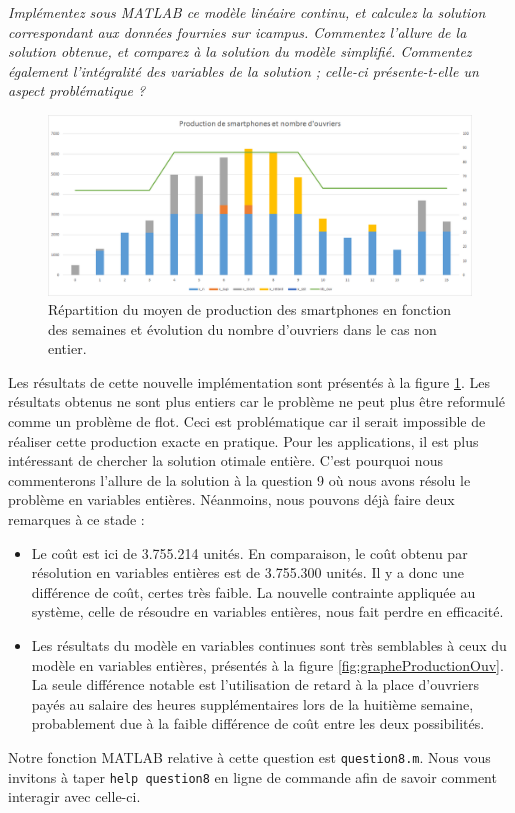 \question %
\emph{Implémentez sous MATLAB ce modèle linéaire continu,
et calculez la solution correspondant aux données fournies sur icampus.
Commentez l'allure de la solution obtenue, et comparez à la solution du modèle
simplifié. Commentez également l'intégralité des variables de la solution ;
celle-ci présente-t-elle un aspect problématique ?}

\begin{figure}[H]
  \begin{center}
    \includegraphics[scale = 0.75]{img/grapheProductionOuvNonInt.png}
	  \caption{Répartition du moyen de production des smartphones en fonction des semaines et évolution du nombre d'ouvriers dans le cas non entier.}
	  \label{fig:grapheProductionOuvNonInt}
  \end{center}
\end{figure}

Les résultats de cette nouvelle implémentation sont présentés à la figure \ref{fig:grapheProductionOuvNonInt}. Les résultats obtenus ne sont plus entiers car le problème ne peut plus être reformulé comme un problème de flot. Ceci est problématique car il serait impossible de réaliser cette production exacte en pratique. Pour les applications, il est plus intéressant de chercher la solution otimale entière. C'est pourquoi nous commenterons l'allure de la solution à la question 9 où nous avons résolu le problème en variables entières. Néanmoins, nous pouvons déjà faire deux remarques à ce stade :
\begin{itemize}
\item Le coût est ici de 3.755.214 unités. En comparaison, le coût obtenu par résolution en variables entières est de 3.755.300 unités. Il y a donc une différence de coût, certes très faible. La nouvelle contrainte appliquée au système, celle de résoudre en variables entières, nous fait perdre en efficacité. 
\item Les résultats du modèle en variables continues sont très semblables à ceux du modèle en variables entières, présentés à la figure \ref{fig:grapheProductionOuv}. La seule différence notable est l'utilisation de retard à la place d'ouvriers payés au salaire des heures supplémentaires lors de la huitième semaine, probablement due à la faible différence de coût entre les deux possibilités.
\end{itemize}

Notre fonction MATLAB relative à cette question est \texttt{question8.m}. Nous vous invitons à taper \texttt{help question8} en ligne de commande afin de savoir comment interagir avec celle-ci.